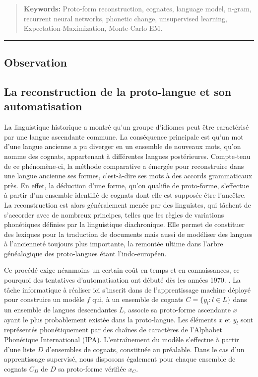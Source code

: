 \documentclass[10pt, french]{article}
\begin{document}
\begin{abstract}
        \textbf{Keywords:} Proto-form reconstruction, cognates, language model, n-gram, recurrent neural networks, phonetic change, unsupervised learning, Expectation-Maximization, Monte-Carlo EM.
        
	\end{abstract}

	\begin{center}
		\rule{150mm}{0.2mm}
	\end{center}		

	\vspace{5mm}
	
\begin{multicols*}{2}

\renewcommand*\contentsname{Sommaire}
\tableofcontents

\section{Observation}
\subsection{La reconstruction de la proto-langue et son automatisation}
La linguistique historique a montré qu'un groupe d'idiomes peut être caractérisé 
par une langue ascendante commune. La conséquence principale est qu'un mot d'une 
langue ancienne a pu diverger en un ensemble de nouveaux mots, qu'on nomme des 
cognats, appartenant à différentes langues postérieures. Compte-tenu de ce 
phénomène-ci, la méthode comparative a émergée pour reconstruire dans une langue 
ancienne ses formes, c'est-à-dire ses mots à des accords grammaticaux près. 
En effet, la déduction d'une forme, qu'on qualifie de proto-forme, s'effectue à partir 
d'un ensemble identifié de cognats dont elle est supposée être l'ancêtre. 
La reconstruction est alors généralement menée par des linguistes, qui tâchent de s'accorder 
avec de nombreux principes, telles que les règles de variations phonétiques définies par 
la linguistique diachronique. Elle permet de constituer des lexiques pour la traduction de documents 
mais aussi de modéliser des langues à l'ancienneté toujours plus importante, la remontée ultime dans 
l'arbre généalogique des proto-langues étant l'indo-européen.\cite{campbell}

Ce procédé exige néanmoins un certain coût en temps et en connaissances, ce pourquoi des tentatives 
d'automatisation ont débuté dès les années 1970. \cite{bouchard}. La tâche informatique à réaliser 
ici s'inscrit dans de l'apprentissage machine déployé pour construire un modèle $f$ qui, à un ensemble 
de cognats $C=\{y_l : l \in L\}$ dans un ensemble de langues descendantes $L$, associe sa proto-forme 
ascendante $x$ ayant le plus probablement existée dans la proto-langue. Les éléments $x$ et $y_l$ sont 
représentés phonétiquement par des chaînes de caractères de l'Alphabet Phonétique International (IPA). 
L'entraînement du modèle s'effectue à partir d'une liste $D$ d'ensembles de cognats, constituée 
au préalable. Dans le cas d'un apprentissage supervisé, nous disposons également pour chaque ensemble 
de cognats $C_D$ de $D$ sa proto-forme vérifiée $x_C$.


\end{multicols*}
\end{document}
